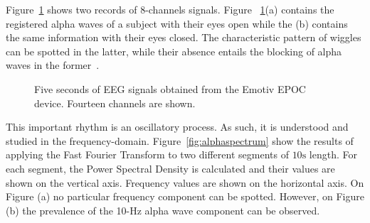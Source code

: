 Figure~\ref{fig:alphawavessignals} shows two records of 8-channels signals.  Figure ~\ref{fig:alphawavessignals}(a) contains the registered alpha waves of a subject with their eyes open while the (b) contains the same information with their eyes closed.  The characteristic pattern of wiggles can be spotted in the latter, while their absence entails the blocking of alpha waves in the former~\cite{Basar2012}.

\begin{figure}[h!]
\centering
{}
\caption[Alpha Waves Wiggles]{Five seconds of EEG signals obtained from the Emotiv EPOC device.  Fourteen channels are shown.}
\label{fig:alphawavessignals}
\end{figure}

This important rhythm is an oscillatory process.  As such, it is understood and studied in the frequency-domain.   Figure~\ref{fig:alphaspectrum} show the results of applying the Fast Fourier Transform to two different segments of $10\si{\second}$ length.  For each segment, the Power Spectral Density is calculated and their values are shown on the vertical axis.  Frequency values are shown on the horizontal axis.   On Figure (a) no particular frequency component can be spotted.  However, on Figure (b) the prevalence of the 10-\si{\hertz} alpha wave component can be observed.   
 
